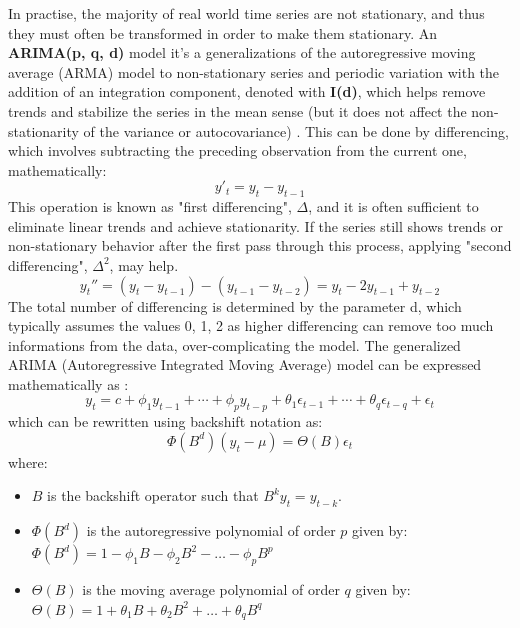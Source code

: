 In practise, the majority of real world time series are not stationary, and thus they must often be transformed in order to make them stationary. An \textbf{ARIMA(p, q, d)} model it's a generalizations of the autoregressive moving average (ARMA) model to non-stationary series and periodic variation with the addition of an integration component, denoted with \textbf{I(d)}, which helps  remove trends and stabilize the series in the mean sense (but it does not affect the non-stationarity of the variance or autocovariance) \cite{chatfield2009}. This can be done by differencing, which involves subtracting the preceding observation from the current one, mathematically:
\begin{equation}
 y'_t = y_t - y_{t-1}
\end{equation}
This operation is known as "first differencing",  \(\Delta\), and it is often sufficient to eliminate linear trends and achieve stationarity. If the series still shows trends or non-stationary behavior after the first pass through this process, applying "second differencing", \(\Delta^2\), may help. 
\begin{equation}
 y_t'' = (y_t - y_{t-1}) - (y_{t-1} - y_{t-2}) = y_t - 2y_{t-1} + y_{t-2}
\end{equation}
The total number of differencing is determined by the parameter d, which typically assumes the values 0, 1, 2 as higher differencing can remove too much informations from the data, over-complicating the model. The generalized  ARIMA (Autoregressive Integrated Moving Average) model can be expressed mathematically as \cite{Hung2023}: 
\begin{equation}
y_t = c + \phi_1 y_{t-1} + \cdots + \phi_p y_{t-p} + \theta_1 \epsilon_{t-1} + \cdots + \theta_q \epsilon_{t-q} + \epsilon_t
\label{ARIMA equation}
\end{equation}
which can be rewritten using backshift notation as:
\begin{equation}
\Phi(B^d)(y_t - \mu) = \Theta(B)\epsilon_t
\end{equation}
where: 
\begin{itemize}

    \item \( B \) is the backshift operator such that \( B^k y_t = y_{t-k} \).
    \item \( \Phi(B^d) \) is the autoregressive polynomial of order \( p \) given by: \(\Phi(B^d) = 1 - \phi_1 B - \phi_2 B^2 - \ldots - \phi_p B^p\)
    \item \( \Theta(B) \) is the moving average polynomial of order \( q \) given by: \(\Theta(B) = 1 + \theta_1 B + \theta_2 B^2 + \ldots + \theta_q B^q\)
\end{itemize}

